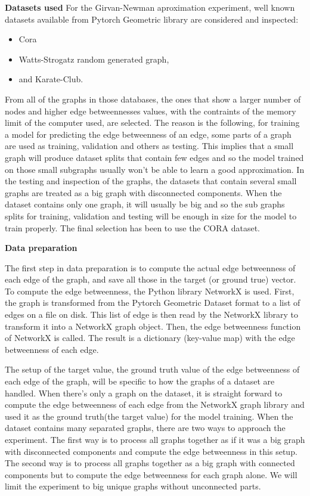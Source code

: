 \textbf{Datasets used}
For the Girvan-Newman aproximation experiment, well known datasets available from Pytorch Geometric library are considered and inspected:
\begin{itemize}
	\item Cora
	\item Watts-Strogatz random generated graph,
	\item and Karate-Club.
\end{itemize}
From all of the graphs in those databases, the ones that show a larger number of nodes and higher edge betweennesses values, with the contraints of the memory limit of the computer used, are selected. The reason is the following, for training a model for predicting the edge betweenness of an edge, some parts of a graph are used as training, validation and others as testing. This implies that a small graph will produce dataset splits that contain few edges and so the model trained on those small subgraphs usually won't be able to learn a good approximation. In the testing and inspection of the graphs, the datasets that contain several small graphs are treated as a big graph with disconnected components. When the dataset contains only one graph, it will usually be big and so the sub graphs splits for training, validation and testing will be enough in size for the model to train properly. The final selection has been to use the CORA dataset. %



\textbf{Data preparation}


The first step in data preparation is to compute the actual edge betweenness of each edge of the graph, and save all those in the target (or ground true) vector. To compute the edge betweenness, the Python library NetworkX is used. First, the graph is transformed from the Pytorch Geometric Dataset format to a list of edges on a file on disk. This list of edge is then read by the NetworkX library to transform it into a NetworkX graph object. Then, the edge betweenness function of NetworkX is called. The result is a dictionary (key-value map) with the edge betweenness of each edge.


The setup of the target value, the ground truth value of the edge betweenness of each edge of the graph, will be specific to how the graphs of a dataset are handled. When there's only a graph on the dataset, it is straight forward to compute the edge betweenness of each edge from the NetworkX graph library and used it as the ground truth(the target value) for the model training. When the dataset contains many separated graphs, there are two ways to approach the experiment. The first way is to process all graphs together as if it was a big graph with disconnected components and compute the edge betweenness in this setup. The second way is to process all graphs together as a big graph with connected components but to compute the edge betweenness for each graph alone. We will limit the experiment to big unique graphs without unconnected parts.



